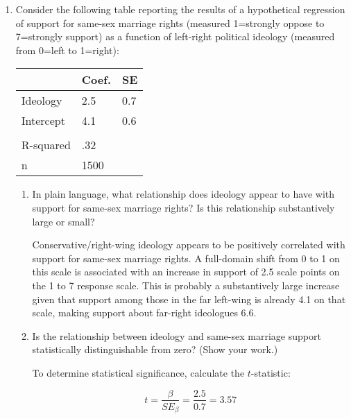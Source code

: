 \documentclass[a4paper]{exam}
\begin{document}
\begin{enumerate}
\begin{enumerate}
\begin{solution}
	\end{solution}
	
	\end{enumerate}

\item Consider the following table reporting the results of a hypothetical regression of support for same-sex marriage rights (measured 1=strongly oppose to 7=strongly support) as a function of left-right political ideology (measured from 0=left to 1=right):

\begin{center}
  \begin{tabular}[c]{@{}lll@{}}
  \toprule
  & Coef. & SE\tabularnewline
  \midrule
  Ideology & 2.5 & 0.7\tabularnewline
  Intercept & 4.1 & 0.6\tabularnewline
  & &\tabularnewline
  R-squared & .32 &\tabularnewline
  n & 1500 &\tabularnewline
  \bottomrule
  \end{tabular}
\end{center}

	\begin{enumerate}
	\item In plain language, what relationship does ideology appear to have with support for same-sex marriage rights? Is this relationship substantively large or small?
	
	\begin{solution}
	
	Conservative/right-wing ideology appears to be positively correlated with support for same-sex marriage rights. A full-domain shift from 0 to 1 on this scale is associated with an increase in support of 2.5 scale points on the 1 to 7 response scale. This is probably a substantively large increase given that support among those in the far left-wing is already 4.1 on that scale, making support about far-right ideologues 6.6.
	
	\end{solution}
	
	\item Is the relationship between ideology and same-sex marriage support statistically distinguishable from zero? (Show your work.)
	
	\begin{solution}
	
	To determine statistical significance, calculate the $t$-statistic:
	
	\begin{equation}
	t = \dfrac{\beta}{SE_\beta} = \dfrac{2.5}{0.7} = 3.57
	\end{equation}
	

\end{solution}
\end{enumerate}
\end{enumerate}
\end{document}
